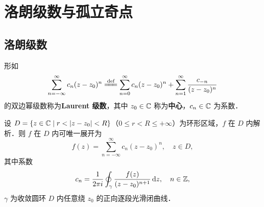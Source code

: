 \documentclass[12pt, a4paper, oneside, UTF8]{ctexbook}
\begin{document}
%
\else
\fi
\chapter{洛朗级数与孤立奇点}
\section{洛朗级数}
\begin{definition}[洛朗级数]
形如
\[
\sum_{n=-\infty}^{\infty} c_n (z-z_0)^n \defeq \sum_{n=0}^{\infty} c_n(z-z_0)^n + \sum_{n=1}^{\infty}\frac{c_{-n}}{(z-z_0)^n}
\]
的双边幂级数称为\textbf{Laurent 级数}，其中 $z_0\in\mathbb{C}$ 称为\textbf{中心}，$c_n\in\mathbb{C}$ 为系数．
\end{definition}

\begin{theorem}[Laurent 定理]
设 $D = \{z\in\mathbb{C}\mid r < \abs{z-z_0} < R\}$（$0\le r<R\le+\infty$）为环形区域，$f$ 在 $D$ 内解析．则 $f$ 在 $D$ 内可唯一展开为
\[
f(z) = \sum_{n=-\infty}^{\infty} c_n (z-z_0)^n,\quad z\in D,
\]
其中系数
\[
c_n = \frac{1}{2\pi i}\oint_\gamma \frac{f(z)}{(z-z_0)^{n+1}}\,\mathrm{d} z,\quad n\in\mathbb{Z},
\]
$\gamma$ 为收敛圆环 $D$ 内任意绕 $z_0$ 的正向逐段光滑闭曲线．
\end{theorem}
\end{document}
